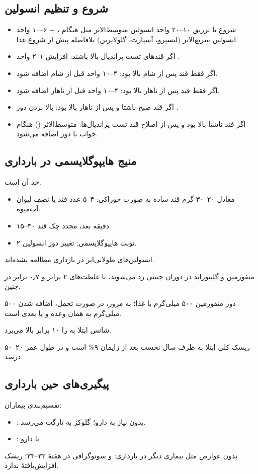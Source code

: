 \documentclass[12pt,a4paper]{article}
\begin{document}
\subsection*{شروع و تنظیم انسولین}
\begin{itemize}
\item شروع با تزریق ۱۰--۲۰ واحد انسولین متوسط‌الاثر مثل  هنگام ، + ۶--۱۰ واحد انسولین سریع‌الاثر (لیسپرو، آسپارت، گلولایزین) بلافاصله پیش از شروع غذا.
\item اگر قندهای تست پراندیال بالا باشند: افزایش ۱--۲ واحد .
\item اگر فقط قند پس از شام بالا بود: ۴--۱۰ واحد  قبل از شام اضافه شود.
\item اگر فقط قند پس از ناهار بالا بود: ۴--۱۰ واحد  قبل از ناهار اضافه شود.
\item اگر قند صبح ناشتا و پس از ناهار بالا بود: بالا بردن دوز .
\item اگر قند ناشتا بالا بود و پس از اصلاح قند تست پراندیال‌ها: متوسط‌الاثر () هنگام خواب با دوز  اضافه می‌شود.
\end{itemize}
\subsection*{منیج هایپوگلایسمی در بارداری}
حد آن  است.
\begin{itemize}
\item معادل ۲۰--۳۰ گرم قند ساده به صورت خوراکی: ۴--۵ عدد قند یا نصف لیوان آب‌میوه.
\item ۱۵--۳۰ دقیقه بعد، مجدد چک قند.
\item ۲ نوبت هایپوگلایسمی: تغییر دوز انسولین.
\end{itemize}
انسولین‌های طولانی‌اثر در بارداری مطالعه نشده‌اند.

متفورمین و گلیبوراید در دوران جنینی رد می‌شوند، با غلظت‌های ۲ برابر و ۰٫۷ برابر در جنین. 

دوز متفورمین ۵۰۰ میلی‌گرم با غذا؛ به مرور، در صورت تحمل، اضافه شدن ۵۰۰ میلی‌گرم به همان وعده و یا بعدی است.

 شانس ابتلا به  را ۱۰ برابر بالا می‌برد.

ریسک کلی ابتلا به  ظرف سال نخست بعد از زایمان ۹\% است و در طول عمر ۲۰--۵۰ درصد.
\subsection*{پیگیری‌های حین بارداری}
تقسیم‌بندی بیماران:
\begin{itemize}
\item {}: بدون نیاز به دارو؛ گلوکز به تارگت می‌رسد.
\item {}: با دارو.
\end{itemize}
 بدون عوارض مثل بیماری دیگر در بارداری:  و سونوگرافی در هفتهٔ ۳۲--۳۴؛ ریسک افزایش‌یافتهٔ  ندارد.
\end{document}
